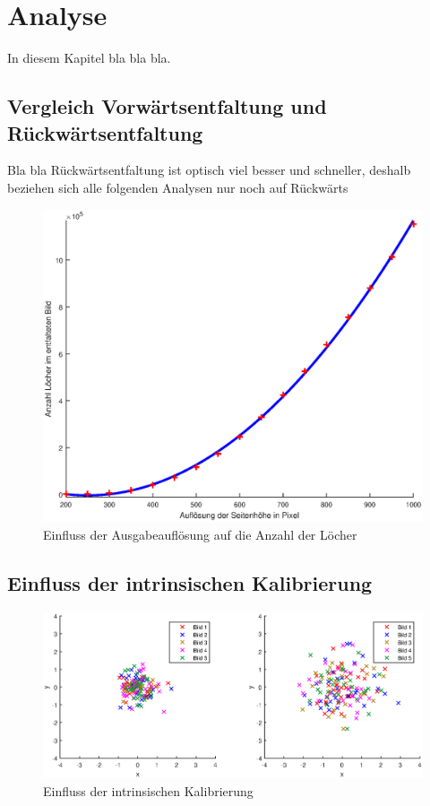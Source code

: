 \chapter{Analyse}
In diesem Kapitel bla bla bla.


\section{Vergleich Vorwärtsentfaltung und Rückwärtsentfaltung}

Bla bla Rückwärtsentfaltung ist optisch viel besser und schneller, deshalb beziehen sich alle folgenden Analysen nur noch auf Rückwärts


\begin{figure}[!htb]
	\centering
	\includegraphics[width=\textwidth]{images/numberOfHoles.eps}
	\caption{Einfluss der Ausgabeauflösung auf die Anzahl der Löcher}
	\label{fig:influenceRes}
\end{figure}

\section{Einfluss der intrinsischen Kalibrierung}

\begin{figure}[!htb]
	\centering
	\includegraphics[width=\textwidth]{images/reprojectionErrorReverse.eps}
	\caption{Einfluss der intrinsischen Kalibrierung}
	\label{fig:influenceCalib}
\end{figure}

